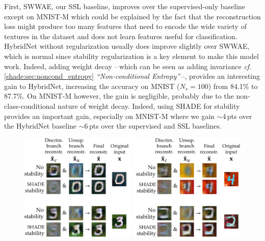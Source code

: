  First, \ac{SWWAE}, our \ac{SSL} baseline, improves over the supervised-only baseline except on MNIST-M which could be explained by the fact that the reconstruction loss might produce too many features that need to encode the wide variety of textures in the dataset and does not learn features useful for classification. HybridNet without regularization usually does improve slightly over \ac{SWWAE}, which is normal since stability regularization is a key element to make this model work. Indeed, adding weight decay --\,which can be seen as adding invariance \textit{cf.} \autoref{shade:sec:noncond_entropy} \textit{``Non-conditional Entropy''}\,--, provides an interesting gain to HybridNet, increasing the accuracy on MNIST ($N_s = 100$) from 84.1\% to 87.7\%. On MNIST-M however, the gain is negligible, probably due to the non-class-conditional nature of weight decay. Indeed, using \ac{SHADE} for stability provides an important gain, especially on MNIST-M where we gain $\sim$4\,pts over the HybridNet baseline $\sim$6\,pts over the supervised and \ac{SSL} baselines.

 \begin{figure}[t]
  \centering
  \includegraphics[width=1\textwidth]{images/hybridnet_withshade_samples}
    \label{hybridnet:fig:samples_with_shade}
\end{figure}

